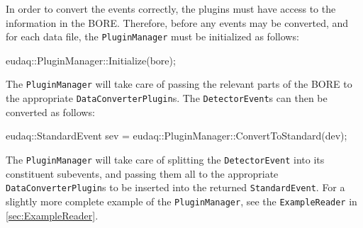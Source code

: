 In order to convert the events correctly,
the plugins must have access to the information in the BORE.
Therefore, before any events may be converted, and for each data file,
the \texttt{PluginManager} must be initialized as follows:
\begin{listing}
eudaq::PluginManager::Initialize(bore);
\end{listing}

The \texttt{PluginManager} will take care of passing the relevant parts of the \gls{BORE}
to the appropriate \texttt{DataConverterPlugin}s.
The \texttt{DetectorEvent}s can then be converted as follows:
\begin{listing}
eudaq::StandardEvent sev = eudaq::PluginManager::ConvertToStandard(dev);
\end{listing}

The \texttt{PluginManager} will take care of splitting the \texttt{DetectorEvent}
into its constituent subevents, and passing them all to the appropriate
\texttt{DataConverterPlugin}s to be inserted into the returned \texttt{StandardEvent}.
For a slightly more complete example of the \texttt{PluginManager},
see the \texttt{ExampleReader} in \autoref{sec:ExampleReader}.


